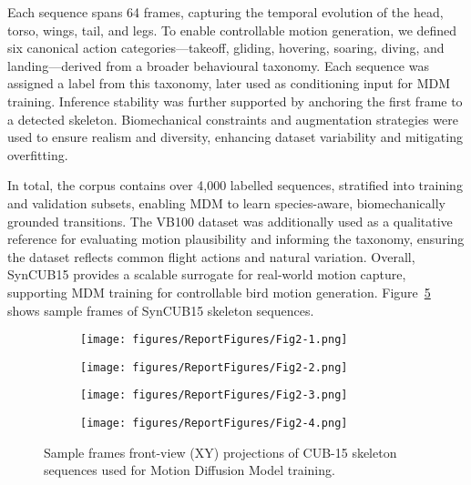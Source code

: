 \documentclass[final-report]{report-template}
\begin{document}
Each sequence spans 64 frames, capturing the temporal evolution of the head, torso, wings, tail, and legs. To enable controllable motion generation, we defined six canonical action categories—takeoff, gliding, hovering, soaring, diving, and landing—derived from a broader behavioural taxonomy. Each sequence was assigned a label from this taxonomy, later used as conditioning input for MDM training. Inference stability was further supported by anchoring the first frame to a detected skeleton.  Biomechanical constraints and augmentation strategies were used to ensure realism and diversity, enhancing dataset variability and mitigating overfitting.  

In total, the corpus contains over 4,000 labelled sequences, stratified into training and validation subsets, enabling MDM to learn species-aware, biomechanically grounded transitions. The VB100 dataset was additionally used as a qualitative reference for evaluating motion plausibility and informing the taxonomy, ensuring the dataset reflects common flight actions and natural variation. Overall, SynCUB15 provides a scalable surrogate for real-world motion capture, supporting MDM training for controllable bird motion generation. Figure~\ref{fig:frame_comparison_2} shows sample frames of SynCUB15 skeleton sequences.


\begin{figure}[htbp]
    \centering

    \begin{subfigure}[t]{0.23\textwidth}
        \centering
        \texttt{[image: figures/ReportFigures/Fig2-1.png]}
        \label{fig:gen_frame1}
    \end{subfigure}\hfill
    \begin{subfigure}[t]{0.23\textwidth}
        \centering
        \texttt{[image: figures/ReportFigures/Fig2-2.png]}
        \label{fig:gen_frame2}
    \end{subfigure}\hfill
    \begin{subfigure}[t]{0.23\textwidth}
        \centering
        \texttt{[image: figures/ReportFigures/Fig2-3.png]}
        \label{fig:gen_frame3}
    \end{subfigure}\hfill
    \begin{subfigure}[t]{0.23\textwidth}
        \centering
        \texttt{[image: figures/ReportFigures/Fig2-4.png]}
        \label{fig:gen_frame4}
    \end{subfigure}

    \caption{Sample frames front-view (XY) projections of CUB-15 skeleton sequences used for Motion Diffusion Model training.}
    \label{fig:frame_comparison_2}
\end{figure}
\end{document}
